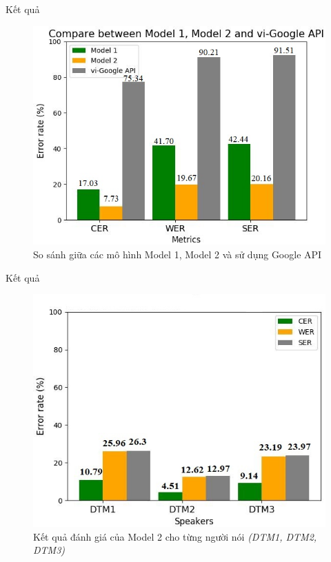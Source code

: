 \documentclass[10pt,a4paper,openany]{beamer}
\begin{document}
	\begin{frame}{Kết quả}
		\begin{figure}[htbp]
			\centerline{\includegraphics[scale=0.35]{charts/compare.jpg}}
			\caption{So sánh giữa các mô hình Model 1, Model 2 và sử dụng Google API}
			\label{fig_cp_model2_ggapi}
		\end{figure}
	\end{frame}
	
	\begin{frame}{Kết quả}
		\begin{figure}[htbp]
			\centerline{\includegraphics[scale=0.35]{charts/model2_everyone.jpg}}
			\caption{Kết quả đánh giá của Model 2 cho từng người nói \emph{(DTM1, DTM2, DTM3)}}
			\label{fig_cp_model2_everyone}
		\end{figure}
	\end{frame}
	
\end{document}
